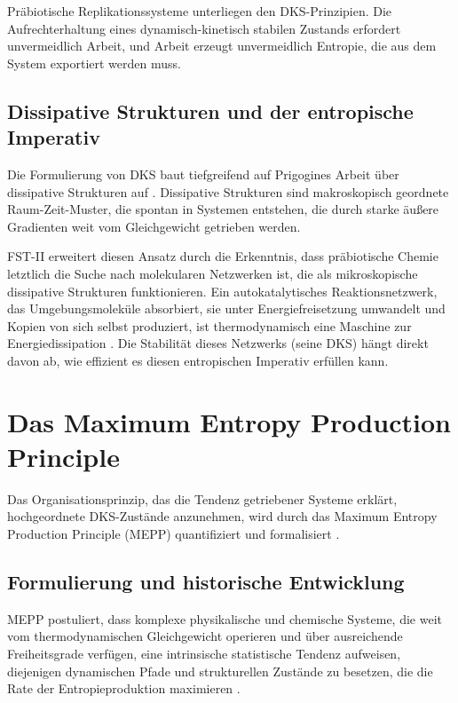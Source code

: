 \documentclass[12pt,a4paper]{article}
\theoremstyle{remark}
\begin{document}
Pr\"abiotische Replikationssysteme unterliegen den DKS-Prinzipien. Die Aufrechterhaltung eines dynamisch-kinetisch stabilen Zustands erfordert unvermeidlich Arbeit, und Arbeit erzeugt unvermeidlich Entropie, die aus dem System exportiert werden muss.

\subsection{Dissipative Strukturen und der entropische Imperativ}

Die Formulierung von DKS baut tiefgreifend auf Prigogines Arbeit \"uber dissipative Strukturen auf \citep{Bioenergetics}. Dissipative Strukturen sind makroskopisch geordnete Raum-Zeit-Muster, die spontan in Systemen entstehen, die durch starke \"au\ss{}ere Gradienten weit vom Gleichgewicht getrieben werden.

FST-II erweitert diesen Ansatz durch die Erkenntnis, dass pr\"abiotische Chemie letztlich die Suche nach molekularen Netzwerken ist, die als mikroskopische dissipative Strukturen funktionieren. Ein autokatalytisches Reaktionsnetzwerk, das Umgebungsmolek\"ule absorbiert, sie unter Energiefreisetzung umwandelt und Kopien von sich selbst produziert, ist thermodynamisch eine Maschine zur Energiedissipation \citep{Bioenergetics}. Die Stabilit\"at dieses Netzwerks (seine DKS) h\"angt direkt davon ab, wie effizient es diesen entropischen Imperativ erf\"ullen kann.

\section{Das Maximum Entropy Production Principle}
\label{sec:mepp}

Das Organisationsprinzip, das die Tendenz getriebener Systeme erkl\"art, hochgeordnete DKS-Zust\"ande anzunehmen, wird durch das Maximum Entropy Production Principle (MEPP) quantifiziert und formalisiert \citep{EntropyMEPP,MEPP2006}.

\subsection{Formulierung und historische Entwicklung}

MEPP postuliert, dass komplexe physikalische und chemische Systeme, die weit vom thermodynamischen Gleichgewicht operieren und \"uber ausreichende Freiheitsgrade verf\"ugen, eine intrinsische statistische Tendenz aufweisen, diejenigen dynamischen Pfade und strukturellen Zust\"ande zu besetzen, die die Rate der Entropieproduktion maximieren \citep{ThermodynamicsOrganisms}.
\end{document}
